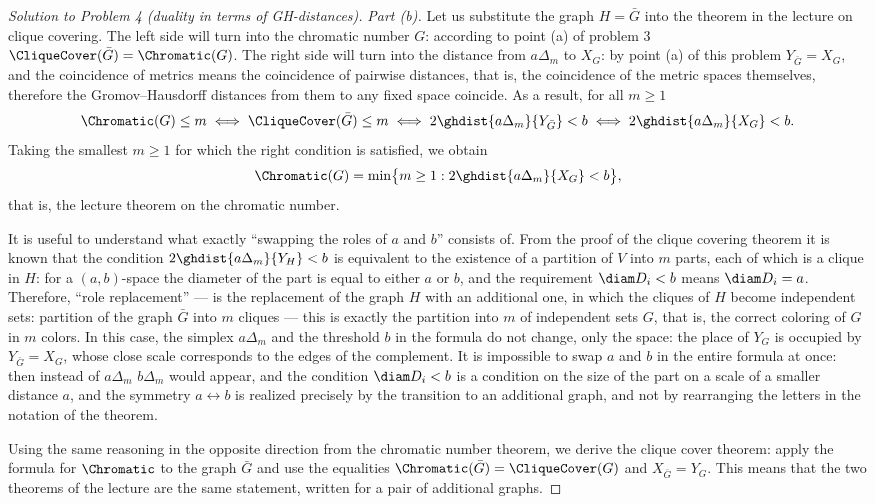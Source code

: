 \documentclass[a4paper,12pt]{report}
\begin{document}
\begin{proof}[Solution to Problem \textup{4} \textup{(}duality in terms of GH-distances\textup{)}]
\textit{Part \textup{(b)}.} Let us substitute the graph $H=\bar G$ into the theorem in the lecture on clique covering. The left side will turn into the chromatic number $G$\textup{:} according to point \textup{(a)} of problem \textup{3} $\CliqueCover(\bar G)=\Chromatic(G)$. The right side will turn into the distance from $a\Delta_m$ to $X_G$\textup{:} by point \textup{(a)} of this problem $Y_{\bar G}=X_G$, and the coincidence of metrics means the coincidence of pairwise distances, that is, the coincidence of the metric spaces themselves, therefore the Gromov--Hausdorff distances from them to any fixed space coincide. As a result, for all $m\ge1$
\[
\Chromatic(G)\le m\iff \CliqueCover(\bar G)\le m\iff 2\ghdist{a\Delta_m}{Y_{\bar G}}<b\iff 2\ghdist{a\Delta_m}{X_G}<b.
\]
Taking the smallest $m\ge1$ for which the right condition is satisfied, we obtain
\[
\Chromatic(G)=\min\bigl\{m\ge1:2\ghdist{a\Delta_m}{X_G}<b\bigr\},
\]
that is, the lecture theorem on the chromatic number.

It is useful to understand what exactly ``swapping the roles of $a$ and $b$'' consists of. From the proof of the clique covering theorem it is known that the condition $2\ghdist{a\Delta_m}{Y_H}<b$ is equivalent to the existence of a partition of $V$ into $m$ parts, each of which is a clique in $H$\textup{:} for a $(a,b)$-space the diameter of the part is equal to either $a$ or $b$, and the requirement $\diam D_i<b$ means $\diam D_i=a$. Therefore, ``role replacement'' --- is the replacement of the graph $H$ with an additional one, in which the cliques of $H$ become independent sets\textup{:} partition of the graph $\bar G$ into $m$ cliques --- this is exactly the partition into $m$ of independent sets $G$, that is, the correct coloring of $G$ in $m$ colors. In this case, the simplex $a\Delta_m$ and the threshold $b$ in the formula do not change, only the space\textup{:} the place of $Y_G$ is occupied by $Y_{\bar G}=X_G$, whose close scale corresponds to the edges of the complement. It is impossible to swap $a$ and $b$ in the entire formula at once\textup{:} then instead of $a\Delta_m$ $b\Delta_m$ would appear, and the condition $\diam D_i<b$ is a condition on the size of the part on a scale of a smaller distance $a$, and the symmetry $a\leftrightarrow b$ is realized precisely by the transition to an additional graph, and not by rearranging the letters in the notation of the theorem.

Using the same reasoning in the opposite direction from the chromatic number theorem, we derive the clique cover theorem\textup{:} apply the formula for $\Chromatic$ to the graph $\bar G$ and use the equalities $\Chromatic(\bar G)=\CliqueCover(G)$ and $X_{\bar G}=Y_G$. This means that the two theorems of the lecture are the same statement, written for a pair of additional graphs.
\end{proof}
\end{document}
